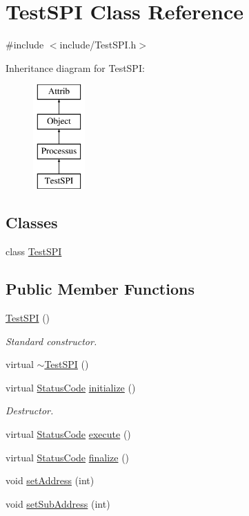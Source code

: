 \hypertarget{classTestSPI}{}\section{Test\+S\+PI Class Reference}
\label{classTestSPI}


{\ttfamily \#include $<$include/\+Test\+S\+P\+I.\+h$>$}

Inheritance diagram for Test\+S\+PI\+:\begin{figure}[H]
\begin{center}
\leavevmode
\includegraphics[height=4.000000cm]{classTestSPI}
\end{center}
\end{figure}
\subsection*{Classes}
\begin{DoxyCompactItemize}
\item 
class \hyperlink{classTestSPI_1_1TestSPI}{Test\+S\+PI}
\end{DoxyCompactItemize}
\subsection*{Public Member Functions}
\begin{DoxyCompactItemize}
\item 
\hyperlink{classTestSPI_a0a4bc6b63f406b3c2830c14873b1ce54}{Test\+S\+PI} ()
\begin{DoxyCompactList}\small\item\em Standard constructor. \end{DoxyCompactList}\item 
virtual \hyperlink{classTestSPI_af557282f685f8dcfb34fcc846bf91bce}{$\sim$\+Test\+S\+PI} ()
\item 
virtual \hyperlink{classStatusCode}{Status\+Code} \hyperlink{classTestSPI_ab2c54cd233a04a583d96fde1f81d4bd6}{initialize} ()
\begin{DoxyCompactList}\small\item\em Destructor. \end{DoxyCompactList}\item 
virtual \hyperlink{classStatusCode}{Status\+Code} \hyperlink{classTestSPI_afe77bfff2e5454c8b3d012721d1f0a99}{execute} ()
\item 
virtual \hyperlink{classStatusCode}{Status\+Code} \hyperlink{classTestSPI_aa07f9e513271f933a9166226505779b0}{finalize} ()
\item 
void \hyperlink{classTestSPI_aaf3401bdea3168f816a4df5a00694c0b}{set\+Address} (int)
\item 
void \hyperlink{classTestSPI_aef2329f6379983f05038752a1ca3f190}{set\+Sub\+Address} (int)
\end{DoxyCompactItemize}
